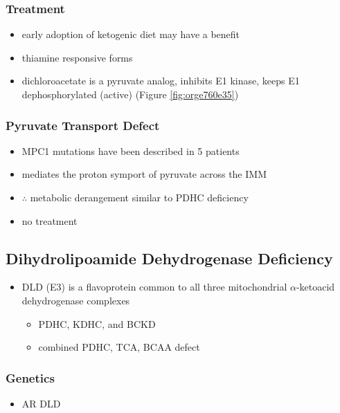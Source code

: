 \documentclass[12pt]{scrartcl}
\begin{document}
\subsubsection{Treatment}
\label{sec:orgcc18047}
\begin{itemize}
\item early adoption of ketogenic diet may have a benefit
\item thiamine responsive forms
\item dichloroacetate is a pyruvate analog, inhibits E1 kinase, keeps E1
dephosphorylated (active) (Figure \ref{fig:orge760e35})
\end{itemize}

\subsubsection{Pyruvate Transport Defect}
\label{sec:org7d6c439}
\begin{itemize}
\item MPC1 mutations have been described in 5 patients
\item mediates the proton symport of pyruvate across the IMM
\item \(\therefore\) metabolic derangement similar to PDHC deficiency
\item no treatment
\end{itemize}

\subsection{Dihydrolipoamide Dehydrogenase Deficiency}
\label{sec:orga19ec7e}
\begin{itemize}
\item DLD (E3) is a flavoprotein common to all three mitochondrial
\(\alpha\)-ketoacid dehydrogenase complexes
\begin{itemize}
\item PDHC, KDHC, and BCKD
\item combined PDHC, TCA, BCAA defect
\end{itemize}
\end{itemize}
\subsubsection{Genetics}
\label{sec:org2d99a36}
\begin{itemize}
\item AR DLD
\end{itemize}
\end{document}
